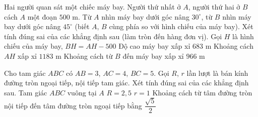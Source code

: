 \begin{ex}%
	Hai người quan sát một chiếc máy bay. Người thứ nhất ở $A$, người thứ hai ở $B$ cách $A$ một đoạn $500$ m. Từ $A$ nhìn máy bay dưới góc nâng $30^\circ$, từ $B$ nhìn máy bay dưới góc nâng $45^\circ$ (biết $A$, $B$ cùng phía so với hình chiếu của máy bay). Xét tính đúng sai của các khẳng định sau (làm tròn đến hàng đơn vị).
	\choiceTF
		{\True Gọi $H$ là hình chiếu của máy bay, $BH=AH-500$}
		{\True Độ cao máy bay xấp xỉ $683$ m}
		{\True Khoảng cách $AH$ xấp xỉ $1183$ m}
		{Khoảng cách từ $B$ đến máy bay xấp xỉ $966$ m}
\end{ex}

\begin{ex}%
	Cho tam giác $ABC$ có $AB=3$, $AC=4$, $BC=5$. Gọi $R$, $r$ lần lượt là bán kính đường tròn ngoại tiếp, nội tiếp tam giác. Xét tính đúng sai của các khẳng định sau.
	\choiceTF
		{\True Tam giác $ABC$ vuông tại $A$}
		{\True $R=2{,}5$}
		{\True $r=1$}
		{\True Khoảng cách từ tâm đường tròn nội tiếp đến tâm đường tròn ngoại tiếp bằng $\dfrac{\sqrt5}{2}$}
\end{ex}
